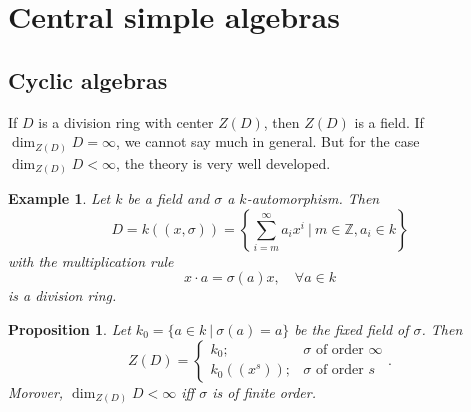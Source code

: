 \documentclass[10pt, a4paper]{article}
\newtheorem{proposition}[thm]{Proposition}
\newtheorem{example}[thm]{Example}
\newcommand{\Z}{\mathbb {Z}}
\begin{document}
\section{Central simple algebras}

\subsection{Cyclic algebras}

If $D$ is a division ring with center $Z(D)$, then $Z(D)$ is a field.
If $\dim_{Z(D)} D = \infty$, we cannot say much in general. But for the case $\dim_{Z(D)} D < \infty$,
the theory is very well developed.

\begin{example}
  Let $k$ be a field and $\sigma$ a $k$-automorphism.
  Then 
  $$D = k((x, \sigma)) = \left\lbrace \sum_{i = m} ^\infty a_i x^i\ |\ m \in \Z, a_i \in k \right\rbrace$$
  with the multiplication rule 
  $$x \cdot a = \sigma(a) x,\quad \forall a \in k$$
  is a division ring.
\end{example}

\begin{proposition}
  Let $k_0 = \{a \in k\ |\ \sigma(a) = a\}$ be the fixed field of $\sigma$.
  Then 
  $$Z(D) = \begin{cases}
    k_0;& \textrm{$\sigma$ of order $\infty$}\\
    k_0((x^s));& \textrm{$\sigma$ of order $s$}
  \end{cases}.$$
  Morover, $\dim_{Z(D)} D < \infty$ iff $\sigma$ is of finite order.
\end{proposition}
\end{document}
